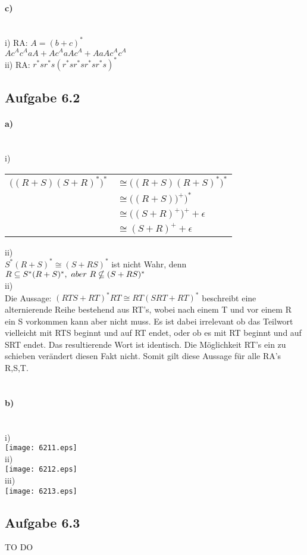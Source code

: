 \documentclass[11pt,a4paper]{article}
\begin{document}
\paragraph*{c)}\ \\
i) RA: $A=(b+c)^*$\\
\hspace*{12mm}$Ac^Ac^AaA+Ac^AaAc^A+AaAc^Ac^A$\\
ii) RA: $r^*sr^*s(r^*sr^*sr^*sr^*s)^*$\\
\subsection*{Aufgabe 6.2}
\paragraph*{a)}\ \\
i)\\
\begin{tabular}{ll}

$\Big ((R+S)(S+R)^* \Big )^*$&$\cong\Big ((R+S)(R+S)^* \Big )^*$\\
&$\cong \Big ((R+S))^+ \Big )^*$\\
&$\cong \Big ((S+R)^+ \Big )^++\epsilon$\\
&$\cong (S+R)^++\epsilon$\\
\end{tabular}
ii)\\
$S^*(R+S)^* \cong (S+RS)^*$  ist nicht Wahr, denn $R \subseteq S^*(R+S)^*,\\~aber~ R \nsubseteq (S+RS)^*$\\
ii)\\
Die Aussage: $(RTS + RT)^* RT \cong RT(SRT + RT)^*$ beschreibt eine alternierende Reihe bestehend aus RT's, wobei nach einem T und vor einem R ein S vorkommen kann aber nicht muss. Es ist dabei irrelevant ob das Teilwort vielleicht mit RTS beginnt und auf RT endet, oder ob es mit RT beginnt und auf SRT endet. Das resultierende Wort ist identisch. Die Möglichkeit RT's ein zu schieben verändert diesen Fakt nicht. Somit gilt diese Aussage für alle RA's R,S,T.\\
\ \\
\paragraph*{b)}\ \\
i)\\
\texttt{[image: 6211.eps]}\\
ii)\\
\texttt{[image: 6212.eps]}\\
iii)\\
\texttt{[image: 6213.eps]}\\
\subsection*{Aufgabe 6.3}
TO DO
\end{document}
